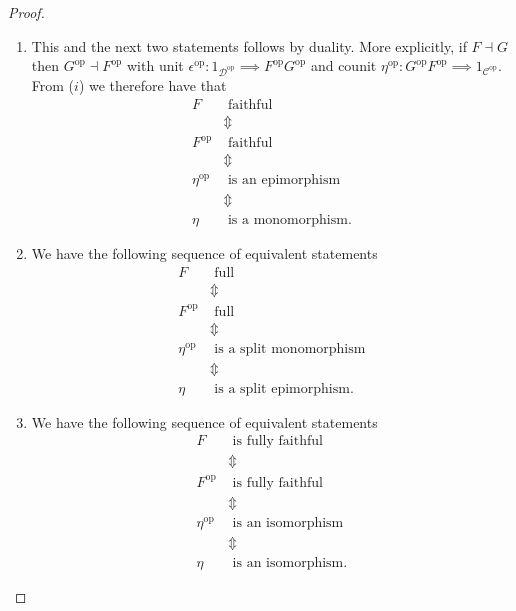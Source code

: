 \begin{proof}
\begin{enumerate}[label=(\roman*)]
  \item This and the next two statements follows by duality. More explicitly, if $ F \dashv G $ then $ G^{\text{op}} \dashv F^{\text{op}} $ with unit $ \epsilon^{\text{op}}: 1_{\mathcal{D}^{\text{op}}} \implies F^{\text{op}}G^{\text{op}} $ and counit $ \eta^{\text{op}}: G^{\text{op}}F^{\text{op}} \implies 1_{\mathcal{C}^{\text{op}}} $. From ($ i $) we therefore have that
    \begin{align*}
      F & \text{ faithful} \\
        &\Updownarrow \\
      F^{\text{op}}& \text{ faithful} \\
                   &\Updownarrow \\
      \eta^{\text{op}} &\text{ is an epimorphism} \\
                       &\Updownarrow \\
      \eta &\text{ is a monomorphism}
    .\end{align*}

  \item We have the following sequence of equivalent statements
    \begin{align*}
      F &\text{ full} \\
        &\Updownarrow \\
      F^{\text{op}} &\text{ full} \\
        &\Updownarrow \\
      \eta^{\text{op}} &\text{ is a split monomorphism} \\
                       &\Updownarrow \\
      \eta &\text{ is a split epimorphism}
    .\end{align*}

  \item We have the following sequence of equivalent statements
    \begin{align*}
      F &\text{ is fully faithful} \\
        &\Updownarrow \\
      F^{\text{op}}  &\text{ is fully faithful} \\
                     &\Updownarrow \\
      \eta^{\text{op}}&\text{ is an isomorphism} \\
                      &\Updownarrow \\
      \eta &\text{ is an isomorphism}
    .\end{align*}
  \end{enumerate}
\end{proof}

